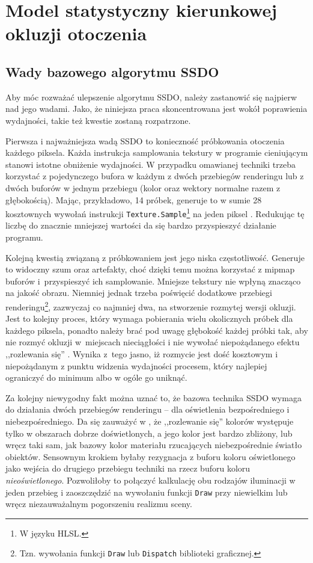 \chapter{Model statystyczny kierunkowej okluzji otoczenia}
\label{t:algorytm}


	\section{Wady bazowego algorytmu SSDO}
	\label{t:algorytm:wady-ssdo}
	
	
	Aby móc rozważać ulepszenie algorytmu SSDO, należy zastanowić się najpierw nad jego wadami. Jako, że niniejsza praca skoncentrowana jest wokół poprawienia wydajności, takie też kwestie zostaną rozpatrzone.
	
	Pierwsza i najważniejsza wadą SSDO to konieczność próbkowania otoczenia każdego piksela. Każda instrukcja samplowania tekstury w programie cieniującym stanowi istotne obniżenie wydajności. W przypadku omawianej techniki trzeba korzystać z pojedynczego bufora w każdym z dwóch przebiegów renderingu lub z dwóch buforów w jednym przebiegu (kolor oraz wektory normalne razem z głębokością). Mając, przykładowo, 14 próbek, generuje to w sumie 28 kosztownych wywołań instrukcji \texttt{Texture.Sample}\footnote{W języku HLSL.} na jeden piksel \cite{luna}. Redukując tę liczbę do znacznie mniejszej wartości da się bardzo przyspieszyć działanie programu.
	
	Kolejną kwestią związaną z próbkowaniem jest jego niska częstotliwość. Generuje to widoczny szum oraz artefakty, choć dzięki temu można korzystać z mipmap buforów i~przyspieszyć ich samplowanie. Mniejsze tekstury nie wpłyną znacząco na jakość obrazu. Niemniej jednak trzeba poświęcić dodatkowe przebiegi renderingu\footnote{Tzn. wywołania funkcji \texttt{Draw} lub \texttt{Dispatch} biblioteki graficznej.}, zazwyczaj co najmniej dwa, na stworzenie rozmytej wersji okluzji. Jest to kolejny proces, który wymaga pobierania wielu okolicznych próbek dla każdego piksela, ponadto należy brać pod uwagę głębokość każdej próbki tak, aby nie rozmyć okluzji w~miejscach nieciągłości i nie wywołać niepożądanego efektu ,,rozlewania się'' \cite{luna}. Wynika z~tego jasno, iż rozmycie jest dość kosztowym i niepożądanym z punktu widzenia wydajności procesem, który najlepiej ograniczyć do minimum albo w ogóle go uniknąć.
	
	Za kolejny niewygodny fakt można uznać to, że bazowa technika SSDO wymaga do działania dwóch przebiegów renderingu -- dla oświetlenia bezpośredniego i niebezpośredniego. Da się zauważyć w \cite{ssdo}, że ,,rozlewanie się'' kolorów występuje tylko w obszarach dobrze doświetlonych, a jego kolor jest bardzo zbliżony, lub wręcz taki sam, jak bazowy kolor materiału rzucających niebezpośrednie światło obiektów. Sensownym krokiem byłaby rezygnacja z buforu koloru oświetlonego jako wejścia do drugiego przebiegu techniki na rzecz buforu koloru \emph{nieoświetlonego}. Pozwoliłoby to połączyć kalkulację obu rodzajów iluminacji w jeden przebieg i zaoszczędzić na wywołaniu funkcji \texttt{Draw} przy niewielkim lub wręcz niezauważalnym pogorszeniu realizmu sceny.
	
